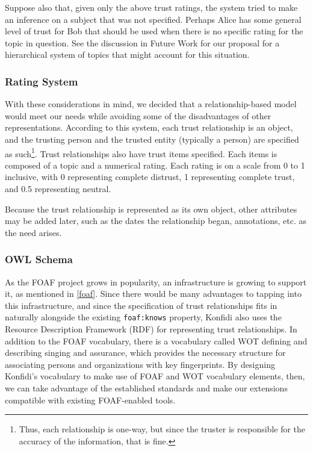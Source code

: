 \documentclass[onecolumn]{acm_proc_article-sp}
\begin{document}
Suppose also that, given only the above trust ratings, the system tried to make an inference on a subject that was not specified.  Perhaps Alice has some general level of trust for Bob that should be used when there is no specific rating for the topic in question.  See the discussion in Future Work for our proposal for a hierarchical system of topics that might account for this situation.

\subsubsection{Rating System}
\label{rating}
With these considerations in mind, we decided that a relationship-based model would meet our needs while avoiding some of the disadvantages of other representations.  According to this system, each trust relationship is an object, and the trusting person and the trusted entity (typically a person) are specified as such\footnote{Thus, each relationship is one-way, but since the truster is responsible for the accuracy of the information, that is fine.}.  Trust relationships also have trust items specified.  Each items is composed of a topic and a numerical rating.  Each rating is on a scale from 0 to 1 inclusive, with 0 representing complete distrust, 1 representing complete trust, and 0.5 representing neutral.

Because the trust relationship is represented as its own object, other attributes may be added later, such as the dates the relationship began, annotations, etc. as the need arises.

\subsubsection{OWL Schema}
As the FOAF project grows in popularity, an infrastructure is growing to support it, as mentioned in \ref{foaf}.  Since there would be many advantages to tapping into this infrastructure, and since the specification of trust relationships fits in naturally alongside the existing \texttt{foaf:knows} property, Konfidi also uses the Resource Description Framework (RDF)\cite{rdf} for representing trust relationships.  In addition to the FOAF vocabulary, there is a vocabulary called WOT defining and describing singing and assurance, which provides the necessary structure for associating persons and organizations with key fingerprints\cite{wot}.  By designing Konfidi's vocabulary to make use of FOAF and WOT vocabulary elements, then, we can take advantage of the established standards and make our extensions compatible with existing FOAF-enabled tools.
\end{document}
